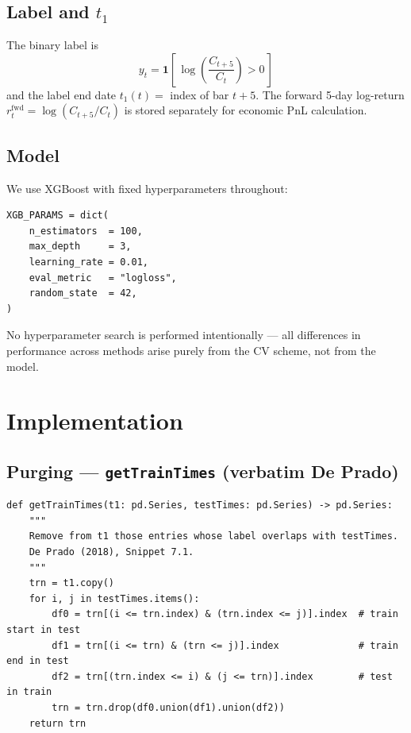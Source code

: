 \documentclass[11pt,a4paper]{article}
\begin{document}
\subsection{Label and $t_1$}

The binary label is
\[
  y_t = \mathbf{1}\!\left[\,\log\!\left(\frac{C_{t+5}}{C_t}\right) > 0\,\right]
\]
and the label end date $t_1(t) = $ index of bar $t+5$.  The forward 5-day
log-return $r_t^{\text{fwd}} = \log(C_{t+5}/C_t)$ is stored separately for
economic PnL calculation.

\subsection{Model}

We use XGBoost with fixed hyperparameters throughout:

\begin{lstlisting}
XGB_PARAMS = dict(
    n_estimators  = 100,
    max_depth     = 3,
    learning_rate = 0.01,
    eval_metric   = "logloss",
    random_state  = 42,
)
\end{lstlisting}

No hyperparameter search is performed intentionally --- all differences in
performance across methods arise purely from the CV scheme, not from the model.

\section{Implementation}

\subsection{Purging --- \texttt{getTrainTimes} (verbatim De Prado)}

\begin{lstlisting}
def getTrainTimes(t1: pd.Series, testTimes: pd.Series) -> pd.Series:
    """
    Remove from t1 those entries whose label overlaps with testTimes.
    De Prado (2018), Snippet 7.1.
    """
    trn = t1.copy()
    for i, j in testTimes.items():
        df0 = trn[(i <= trn.index) & (trn.index <= j)].index  # train start in test
        df1 = trn[(i <= trn) & (trn <= j)].index              # train end in test
        df2 = trn[(trn.index <= i) & (j <= trn)].index        # test in train
        trn = trn.drop(df0.union(df1).union(df2))
    return trn
\end{lstlisting}
\end{document}
